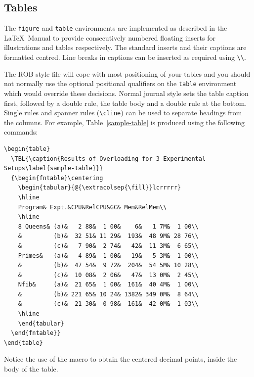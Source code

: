 \documentclass[DTMColor]{ROB-New}
\begin{document}
\subsection{Tables}

The {\tt figure} and {\tt table} environments are implemented as described in
the \LaTeX\ Manual to
provide consecutively numbered floating inserts for illustrations and tables
respectively.
The standard inserts and their captions are formatted centred.
Line breaks in captions can be inserted as required using \verb"\\".

The ROB style file will cope with most positioning of your tables
and you should not normally use the optional positional qualifiers on the
\verb"table" environment which would override these decisions.
Normal journal style sets the table caption first, followed by a double
rule, the table body and a double rule at the bottom.  Single rules and
spanner rules (\verb"\cline") can be used to separate headings from the
columns.  For example, Table~\ref{sample-table} is produced using the
following commands:\vskip0pt
%
{\fontsize{7}{9}\selectfont
\begin{verbatim}
\begin{table}
  \TBL{\caption{Results of Overloading for 3 Experimental Setups\label{sample-table}}}
  {\begin{fntable}\centering
    \begin{tabular}{@{\extracolsep{\fill}}lcrrrrr}
    \hline
    Program& Expt.&CPU&RelCPU&GC& Mem&RelMem\\
    \hline
    8 Queens& (a)&   2 88&  1 00&    6&   1 7M&  1 00\\
    &         (b)&  32 51& 11 29&  193&  48 9M& 28 76\\
    &         (c)&   7 90&  2 74&   42&  11 3M&  6 65\\
    Primes&   (a)&   4 89&  1 00&   19&   5 3M&  1 00\\
    &         (b)&  47 54&  9 72&  204&  54 5M& 10 28\\
    &         (c)&  10 08&  2 06&   47&  13 0M&  2 45\\
    Nfib&     (a)&  21 65&  1 00&  161&  40 4M&  1 00\\
    &         (b)& 221 65& 10 24& 1382& 349 0M&  8 64\\
    &         (c)&  21 30&  0 98&  161&  42 0M&  1 03\\
    \hline
    \end{tabular}
  \end{fntable}}
\end{table}
\end{verbatim}}
%
\noindent Notice the use of the \verb"" macro to obtain the centered
decimal points, inside the body of the table.
\end{document}
